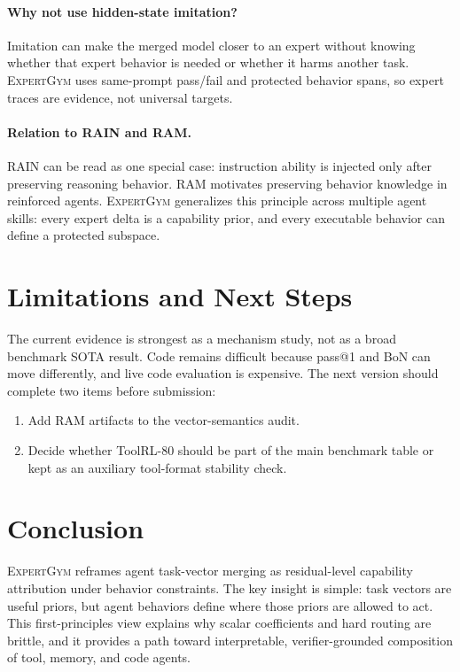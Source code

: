 \documentclass{article}
\newcommand{\method}{\textsc{ExpertGym}\xspace}
\newcommand{\rain}{\textsc{RAIN}\xspace}
\newcommand{\ram}{\textsc{RAM}\xspace}
\begin{document}
\paragraph{Why not use hidden-state imitation?}
Imitation can make the merged model closer to an expert without knowing whether that expert behavior is needed or whether it harms another task.  \method uses same-prompt pass/fail and protected behavior spans, so expert traces are evidence, not universal targets.

\paragraph{Relation to \rain and \ram.}
\rain can be read as one special case: instruction ability is injected only after preserving reasoning behavior.  \ram motivates preserving behavior knowledge in reinforced agents.  \method generalizes this principle across multiple agent skills: every expert delta is a capability prior, and every executable behavior can define a protected subspace.

\section{Limitations and Next Steps}

The current evidence is strongest as a mechanism study, not as a broad benchmark SOTA result.  Code remains difficult because pass@1 and BoN can move differently, and live code evaluation is expensive.  The next version should complete two items before submission:

\begin{enumerate}[leftmargin=*]
    \item Add RAM artifacts to the vector-semantics audit.
    \item Decide whether ToolRL-80 should be part of the main benchmark table or kept as an auxiliary tool-format stability check.
\end{enumerate}

\section{Conclusion}

\method reframes agent task-vector merging as residual-level capability attribution under behavior constraints.  The key insight is simple: task vectors are useful priors, but agent behaviors define where those priors are allowed to act.  This first-principles view explains why scalar coefficients and hard routing are brittle, and it provides a path toward interpretable, verifier-grounded composition of tool, memory, and code agents.



\end{document}
